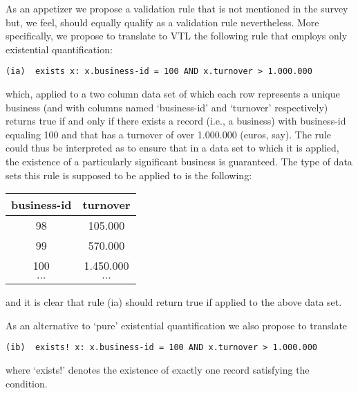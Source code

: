 As an appetizer we propose a validation rule that is not mentioned in the survey but, we feel, should equally qualify as a validation rule nevertheless. More specifically, we propose to translate to VTL the following rule that employs only existential quantification:
\begin{verbatim}
(ia)  exists x: x.business-id = 100 AND x.turnover > 1.000.000
\end{verbatim}
which, applied to a two column data set of which each row represents a unique business (and with columns named `business-id' and `turnover' respectively) returns true if and only if there exists a record (i.e., a business) with business-id equaling 100 and that has a turnover of over 1.000.000 (euros, say). The rule could thus be interpreted as to ensure that in a data set to which it is applied, the existence of a particularly significant business is guaranteed. The type of data sets this rule is supposed to be applied to is the following:
\begin{center}
\begin{tabular}[c]{|c|c|}
\hline
business-id & turnover \\
\hline
\hline
98 & 105.000 \\
\hline
99 & 570.000 \\
\hline
100 & 1.450.000 \\
\hline
$\cdots$ & $\cdots$ \\
\hline
\end{tabular}
\end{center}
and it is clear that rule (ia) should return true if applied to the above data set.


As an alternative to `pure' existential quantification we also propose to translate
\begin{verbatim}
(ib)  exists! x: x.business-id = 100 AND x.turnover > 1.000.000
\end{verbatim}
where `exists!' denotes the existence of exactly one record satisfying the condition.

